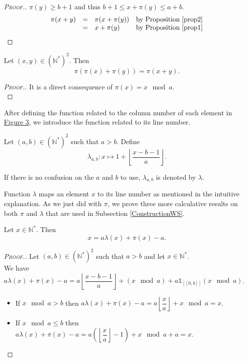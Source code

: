 \begin{proof}[\textsc{Proof.}]
\(\pi(y) \geqslant b + 1\) and thus \(b + 1 \leqslant x + \pi(y) \leqslant a + b\).
\[
\begin{array}{l l l l}
	\pi(x + y) & = & \pi(x + \pi(y)) & \text{by Proposition \ref{prop2}} \\
	 & = & x + \pi(y) & \text{by Proposition \ref{prop1}}
\end{array}
\]
\end{proof}

\begin{proposition}
\label{prop4}
Let \((x,y)\in (\mathbb{N}^*)^2\). Then
\[
\pi(\pi(x)+\pi(y))=\pi(x+y).
\]
\end{proposition}

\begin{proof}[\textsc{Proof.}]
It is a direct consequence of \(\pi(x) = x \mod a\). \\
\end{proof}

After defining the function related to the column number of each element in \hyperref[SchemaWS]{Figure 3},
we introduce the function related to its line number.

\begin{definition}
Let \((a,b) \in (\mathbb{N}^*)^2\) such that \(a>b\). Define
\[ \lambda_{a,b}:x \longmapsto 1+ \left\lfloor\dfrac{x-b-1}{a}\right\rfloor.\]
\end{definition}

If there is no confusion on the \(a\) and \(b\) to use, \(\lambda_{a, b}\) is denoted by \(\lambda\).

Function \(\lambda\) maps an element \(x\) to its line number as mentioned in the intuitive explanation.
As we just did with \(\pi\), we prove three more calculative results on both \(\pi\) and \(\lambda\) that are used in
Subsection \ref{ConstructionWS}.

\begin{proposition}
\label{prop5}
Let \(x\in \mathbb{N}^*\). Then
\[
x=a\lambda(x)+\pi(x)-a.
\]
\end{proposition}

\begin{proof}[\textsc{Proof.}]
Let \((a,b)\in (\mathbb{N}^*)^2\) such that \(a>b\) and let \(x\in \mathbb{N}^*\). \\
We have \(a\lambda(x)+\pi(x)-a=a\left\lfloor\dfrac{x-b-1}{a}\right\rfloor+(x \mod a)+ a \mathds{1}_{ [\![0,b]\!]}(x \mod a)\).

\begin{itemize}
\item If \(x \mod a>b\) then \(a\lambda(x)+\pi(x)-a=a\left\lfloor\dfrac{x}{a}\right\rfloor+x \mod a=x\).
\item If \(x \mod a \leqslant b\) then \(a\lambda(x)+\pi(x)-a=a \left( \left \lfloor \dfrac{x}{a} \right \rfloor - 1 \right)+x \mod a +a=x\).
\end{itemize}
\end{proof}

